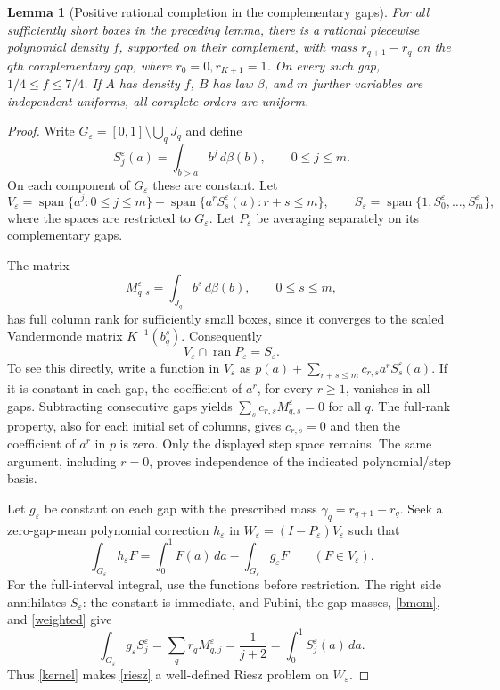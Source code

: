 \documentclass[11pt]{article}
\newtheorem{lemma}{Lemma}
\begin{document}
\begin{lemma}[Positive rational completion in the complementary gaps]
For all sufficiently short boxes in the preceding lemma, there is a
rational piecewise polynomial density $f$, supported on their complement,
with mass $r_{q+1}-r_q$ on the $q$th complementary gap, where
$r_0=0,r_{K+1}=1$. On every such gap, $1/4\le f\le7/4$.
If $A$ has density $f$, $B$ has law $\beta$, and $m$ further variables
are independent uniforms, all complete orders are uniform.
\end{lemma}
\begin{proof}
Write $G_\varepsilon=[0,1]\setminus\bigcup_qJ_q$ and define
\[
 S_j^\varepsilon(a)=\int_{b>a}b^j\,d\beta(b),\qquad 0\le j\le m.
\]
On each component of $G_\varepsilon$ these are constant. Let
\[
 V_\varepsilon=\operatorname{span}\{a^j:0\le j\le m\}
 +\operatorname{span}\{a^rS_s^\varepsilon(a):r+s\le m\},
 \qquad S_\varepsilon=\operatorname{span}\{1,S_0^\varepsilon,\ldots,S_m^\varepsilon\},
\]
where the spaces are restricted to $G_\varepsilon$. Let $P_\varepsilon$
be averaging separately on its complementary gaps.

The matrix
\[
 M_{q,s}^\varepsilon=\int_{J_q}b^s\,d\beta(b),\qquad 0\le s\le m,
\]
has full column rank for sufficiently small boxes, since it converges
to the scaled Vandermonde matrix $K^{-1}(b_q^s)$.
Consequently
\begin{equation}\label{kernel}
 V_\varepsilon\cap\operatorname{ran}P_\varepsilon=S_\varepsilon.
\end{equation}
To see this directly, write a function in $V_\varepsilon$ as
$p(a)+\sum_{r+s\le m}c_{r,s}a^r S_s^\varepsilon(a)$.
If it is constant in each gap, the coefficient of $a^r$, for every
$r\ge1$, vanishes in all gaps. Subtracting consecutive gaps yields
$\sum_s c_{r,s}M_{q,s}^\varepsilon=0$ for all $q$.
The full-rank property, also for each initial set of columns, gives
$c_{r,s}=0$ and then the coefficient of $a^r$ in $p$ is zero.
Only the displayed step space remains. The same argument, including
$r=0$, proves independence of the indicated polynomial/step basis.

Let $g_\varepsilon$ be constant on each gap with the prescribed mass
$\gamma_q=r_{q+1}-r_q$. Seek a zero-gap-mean polynomial correction
$h_\varepsilon$ in
$W_\varepsilon=(I-P_\varepsilon)V_\varepsilon$ such that
\begin{equation}\label{riesz}
 \int_{G_\varepsilon}h_\varepsilon F
   =\int_0^1F(a)\,da-\int_{G_\varepsilon}g_\varepsilon F
                         \qquad(F\in V_\varepsilon).
\end{equation}
For the full-interval integral, use the functions before restriction.
The right side annihilates $S_\varepsilon$: the constant is immediate,
and Fubini, the gap masses, \eqref{bmom}, and \eqref{weighted} give
\[
 \int_{G_\varepsilon}g_\varepsilon S_j^\varepsilon
   =\sum_q r_q M_{q,j}^\varepsilon
   =\frac1{j+2}
   =\int_0^1 S_j^\varepsilon(a)\,da.
\]
Thus \eqref{kernel} makes \eqref{riesz} a well-defined Riesz problem
on $W_\varepsilon$.


\end{proof}
\end{document}
